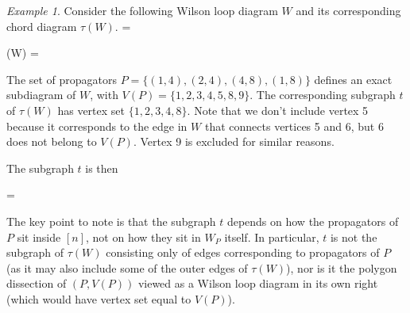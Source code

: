 \documentclass[11pt]{article}
\newcommand{\drawWLD}[2]{

\pgfmathsetmacro{\n}{#1}
\pgfmathsetmacro{\radius}{#2}
\pgfmathsetmacro{\angle}{360/\n}
\draw (0,0) circle (\radius);
    \foreach \i in {1,2,...,\n} {
      \draw (\angle*\i:\radius) node {$\bullet$};
    }

}
\newcommand{\drawpolypart}[2]{
\pgfmathsetmacro{\n}{#1}
\pgfmathsetmacro{\radius}{#2}
\pgfmathsetmacro{\angle}{360/\n}
    \foreach \i in {1,2,...,\n} {
      \draw (\angle*\i+ \angle/2:\radius) node {$\bullet$};
     \pgfmathsetmacro{\x}{\angle*\i - \angle/2}
      \pgfmathsetmacro{\concave}{((\n-1.5)/\n)}
      \draw (\x:\radius cm) .. controls (\angle *\i: \concave* \radius cm) .. (\x + \angle:\radius cm);
    }

}
\newcommand{\drawprop}[4]{
\pgfmathsetmacro{\r}{#1}
\pgfmathsetmacro{\bumpr}{#2}
\pgfmathsetmacro{\s}{#3}
\pgfmathsetmacro{\bumps}{#4}
\pgfmathsetmacro{\perturbe}{\angle/\n}

\begin{scope}
\draw[propagator] (\angle*\r + \angle/2 + \bumpr*\perturbe:\radius) -- (\angle*\s + \angle/2 + \bumps*\perturbe:\radius);
\end{scope}
}
\newcommand{\drawchord}[2]{
\pgfmathsetmacro{\r}{#1}
\pgfmathsetmacro{\s}{#2}

\begin{scope}
\draw (\angle*\r + \angle/2:\radius) -- (\angle*\s + \angle/2:\radius);
\end{scope}
}
\newcommand{\drawnumbers}{
  \foreach \i in {1,2,...,\n} {
  \pgfmathsetmacro{\x}{\angle*\i}
  \draw (\x:\radius*1.15) node {\footnotesize \i};
}
}
\newcommand{\drawnumbersshift}{
  \foreach \i in {1,2,...,\n} {
  \pgfmathsetmacro{\x}{\angle*\i + \angle/2}
  \draw (\x:\radius*1.15) node {\footnotesize \i};
}
}
\def\bas #1\eas{\begin{align*} #1 \end{align*}}
\theoremstyle{remark}
\newtheorem{eg}[thm]{Example}
\theoremstyle{definition}
\begin{document}
\begin{eg}\label{eg:subtrees}
Consider the following Wilson loop diagram $W$ and its corresponding chord diagram $\tau(W)$. 
\bas W =   \; \quad
\tau(W) =  \eas

The set of propagators $P= \{(1,4), (2,4), (4, 8), (1,8) \}$ defines an exact subdiagram of $W$, with $V(P) = \{1,2,3,4,5,8,9\}$.  The corresponding subgraph $t$ of $\tau(W)$ has vertex set $\{1, 2,3, 4, 8\}$. Note that we don't include vertex 5 because it corresponds to the edge in $W$ that connects vertices 5 and 6, but 6 does not belong to $V(P)$. Vertex 9 is excluded for similar reasons.

The subgraph $t$ is then 

\bas t = 
 \eas

The key point to note is that the subgraph $t$ depends on how the propagators of $P$ sit inside $[n]$, not on how they sit in $W_P$ itself.  In particular, $t$ is not the subgraph of $\tau(W)$ consisting only of edges corresponding to propagators of $P$ (as it may also include some of the outer edges of $\tau(W)$), nor is it the polygon dissection of $(P,V(P))$ viewed as a Wilson loop diagram in its own right (which would have vertex set equal to $V(P)$).
\end{eg}
\end{document}
